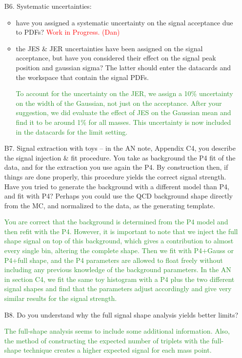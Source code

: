 \documentclass[paper=a4, fontsize=11pt]{scrartcl}
\begin{document}
\begin{itemize}
\begin{itemize}
\begin{itemize}
\end{itemize}
\end{itemize}
\item[B6.] Systematic uncertainties: 
\begin{itemize}
\item have you assigned a systematic uncertainty on the signal acceptance due to PDFs? 
\textcolor{red}{Work in Progress. (Dan)}\\
\item the JES \& JER uncertainties have been assigned on the signal acceptance, but have you considered their effect on the signal peak position and gaussian sigma? The latter should enter the datacards and the workspace that contain the signal PDFs.

\textcolor{ForestGreen}{To account for the uncertainty on the JER, we assign a 10\% uncertainty on the width of the Gaussian, not just on the acceptance. After your suggestion, we did evaluate the effect of JES on the Gaussian mean and find it to be around 1\% for all masses. This uncertainty
is now included in the datacards for the limit setting.}\\

\end{itemize}

\item[B7.] Signal extraction with toys -- in the AN note, Appendix C4, you describe the signal injection \& fit procedure. You take as background the P4 fit of the data, and for the extraction you use again the P4. By construction then, if things are done properly, this procedure yields the correct signal strength. Have you tried to generate the background with a different model than P4, and fit with P4? Perhaps you could use the QCD background shape directly from the MC, and normalized to the data, as the generating template.

\textcolor{ForestGreen}{You are correct that the background is determined from the P4 model and then refit with the P4. However, it is important to note that  we inject the full shape signal on top of this background, which gives a contribution to almost every single bin, altering the complete shape.  Then 
we fit with P4$+$Gauss or P4$+$full shape, and the P4 parameters are allowed to float freely without including any previous knowledge of the background parameters. In the AN in section C4, we fit the same toy histogram with a P4 plus the two different signal shapes and find that the parameters adjust accordingly and give very similar results for the signal strength.}\\

\item[B8.] Do you understand why the full signal shape analysis yields better limits?

\textcolor{ForestGreen}{The full-shape analysis seems to include some additional
information. Also, the method of constructing the expected number of triplets with the full-shape technique creates a higher expected signal for each mass point.}\\

\end{itemize}
\end{document}
